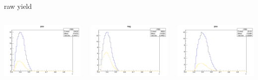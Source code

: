 \begin{frame}{raw yield}
\begin{columns}
\begin{column}[T]{0.25\textwidth}
\includegraphics[width = \textwidth]{results/yield/statistics/yield_x_Q2_z_0.55_4.764_0.40_pos.png}
\end{column}
\begin{column}[T]{0.25\textwidth}
\includegraphics[width = \textwidth]{results/yield/statistics/yield_x_Q2_z_0.55_4.764_0.40_neg.png}
\end{column}
\begin{column}[T]{0.25\textwidth}
\includegraphics[width = \textwidth]{results/yield/statistics/yield_x_Q2_z_0.55_4.764_0.50_pos.png}

\end{column}
\end{columns}
\end{frame}
